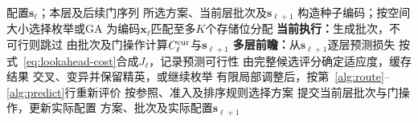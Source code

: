 \begin{algorithm}[!t]
\caption{联合放置的遗传搜索与多层前瞻}
\label{alg:solver}
\PaperAlgorithmSetup
\algrenewcommand{}
\algrenewcommand{}
\algrenewcommand{}
\algrenewcommand{}
\algrenewcommand{}
\algrenewcommand{}
\algrenewcommand{}
\algrenewcommand{}
\algrenewcommand{}
\begin{algorithmic}[1]
\Require 配置$\mathbf{s}_\ell$；本层及后续门序列
\Ensure 所选方案、当前层批次及$\mathbf{s}_{\ell+1}$
\State 构造种子编码；按空间大小选择枚举或GA
  \State 为编码$\mathbf x_\ell$匹配至多$K$个存储位分配
    \State \textbf{当前执行：}生成批次，不可行则跳过 \label{alg:route}
    \State 由批次及门操作计算$C_\ell^{\rm cur}$与$\mathbf{s}_{\ell+1}$
    \State \textbf{多层前瞻：}从$\mathbf{s}_{\ell+1}$逐层预测损失
    \State 按式~\eqref{eq:lookahead-cost}合成$J_\ell$，记录预测可行性 \label{alg:predict}
  \EndFor
  \State 由完整候选评分确定适应度，缓存结果
  \State 交叉、变异并保留精英，或继续枚举
\EndWhile
\State 有限局部调整后，按第~\ref{alg:route}--\ref{alg:predict}行重新评价
\State 按参照、准入及排序规则选择方案
\State 提交当前层批次与门操作，更新实际配置
\State \Return 方案、批次及实际配置$\mathbf{s}_{\ell+1}$
\end{algorithmic}
\end{algorithm}
